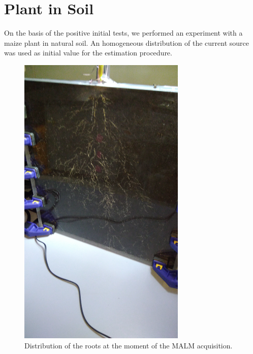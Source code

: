 \documentclass{article}
\begin{document}
\section{Plant in Soil}
On the basis of the positive initial tests, we performed an experiment with a maize plant in natural soil. An homogeneous distribution of the current source was used as initial value for the estimation procedure.
\vspace{2cm}
\begin{figure}[H]
	\centering
	\captionsetup[sub]{margin=0.4cm}
	\includegraphics[width=8cm]{Plant.jpg}
	\caption{Distribution of the roots at the moment of the MALM acquisition.\label{Plant}}
\end{figure}
\end{document}
